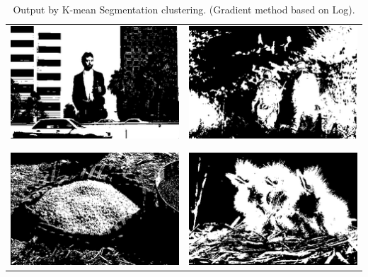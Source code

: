 \documentclass{article}
\begin{document}
\begin{center}
\begin{table}
\begin{tabular}{c| c}
\includegraphics[scale = 0.7]{kmean_1} & \includegraphics[scale = 0.7]{kmean_2}\\
\\\hline\\
\includegraphics[scale = 0.7]{kmean_3} & \includegraphics[scale = 0.7]{kmean_4}\\
\end{tabular}
\caption{Output by K-mean Segmentation clustering. (Gradient method based on Log).}
\label{table:4}
\end{table}
\end{center}
\end{document}
